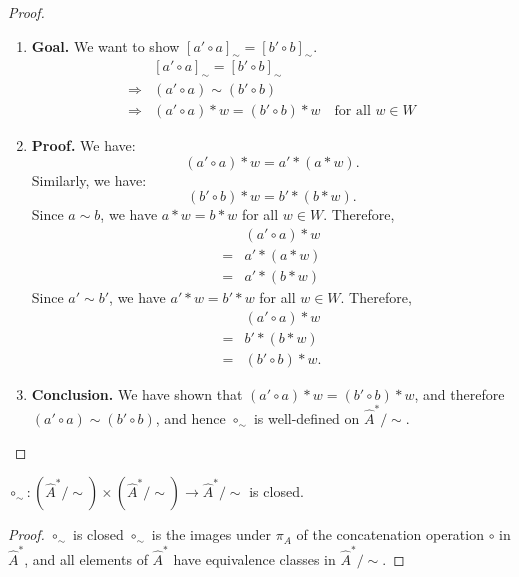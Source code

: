 \begin{proof}
\begin{enumerate}
		\item \textbf{Goal.}
		      We want to show $[a' \circ a]_{\sim} = [b' \circ b]_{\sim}$.
		      \begin{align}
			                    & [a' \circ a]_{\sim} = [b' \circ b]_{\sim}                               \\
			      \Rightarrow{} & (a' \circ a) \sim (b' \circ b)                                          \\
			      \Rightarrow{} & (a' \circ a) \ast w = (b' \circ b) \ast w \quad \text{for all } w \in W
		      \end{align}

		\item \textbf{Proof.}
		      We have:
		      \begin{equation}
			      (a' \circ a) \ast w = a' \ast (a \ast w).
		      \end{equation}
		      Similarly, we have:
		      \begin{equation}
			      (b' \circ b) \ast w = b' \ast (b \ast w).
		      \end{equation}
		      Since $a \sim b$, we have $a \ast w = b \ast w$ for all $w \in W$.
		      Therefore,
		      \begin{align}
			          & (a' \circ a) \ast w \\
			      ={} & a' \ast (a \ast w)  \\
			      ={} & a' \ast (b \ast w)
		      \end{align}
		      Since $a' \sim b'$, we have $a' \ast w = b' \ast w$ for all $w \in W$.
		      Therefore,
		      \begin{align}
			          & (a' \circ a) \ast w  \\
			      ={} & b' \ast (b \ast w)   \\
			      ={} & (b' \circ b) \ast w.
		      \end{align}


		\item \textbf{Conclusion.}
		      We have shown that $(a' \circ a) \ast w = (b' \circ b) \ast w$, and therefore $(a' \circ a) \sim (b' \circ b)$, and hence $\circ_{\sim}$ is well-defined on $\hat{A}^{\ast}/\sim$.
	\end{enumerate}
\end{proof}

\begin{proposition}\label{prp:circ_sim_closed}
	$\circ_{\sim}: (\hat{A}^{\ast}/\sim) \times (\hat{A}^{\ast}/\sim) \to \hat{A}^{\ast}/\sim$ is closed.
\end{proposition}
\begin{proof}
	$\circ_{\sim}$ is closed $\circ_{\sim}$ is the images under $\pi_{A}$ of the concatenation operation $\circ$ in $\hat{A}^{\ast}$, and all elements of $\hat{A}^{\ast}$ have equivalence classes in $\hat{A}^{\ast}/\sim$.
\end{proof}


